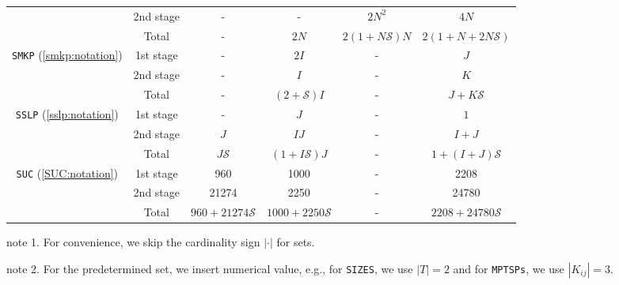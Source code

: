 \begin{table}[H]
{\begin{threeparttable}
\begin{tabular}{@{}cccccc@{}}
				& 2nd stage & -              & -                                  & $2N^2 $              & $4N$                     \\ \cmidrule(l){2-6} 
				& Total          & -              & $2N$                               & $2(1+N\mathcal{S})N$ & $2(1+N+2N\mathcal{S})$    \\ \midrule
				\multirow{3}{*}{\texttt{SMKP} (\ref{smkp:notation})}   & 1st stage & -              & $2I$                               & -                    & $J$                       \\
				& 2nd stage & -              & $I$                                & -                    & $K$                       \\ \cmidrule(l){2-6} 
				& Total          & -              & $(2+\mathcal{S})I$                 & -                    & $J+K\mathcal{S}$          \\ \midrule
				\multirow{3}{*}{\texttt{SSLP} (\ref{sslp:notation})}   & 1st stage & -              & $J$                                & -                    & $1$                       \\
				& 2nd stage & $J$            & $IJ$                               & -                    & $I+J$                     \\ \cmidrule(l){2-6} 
				& Total          & $J\mathcal{S}$ & $(1+I\mathcal{S})J$                & -                    & $1+(I+J)\mathcal{S}$      \\ \midrule
				\multirow{3}{*}{\texttt{SUC} (\ref{SUC:notation})}   & 1st stage & 960               &   1000                                 &     -                 &  2208                         \\
				& 2nd stage & 21274               &     2250                               &   -                   & 24780                          \\ \cmidrule(l){2-6} 
				& Total          & $960+21274\mathcal{S}$                &  $1000+2250\mathcal{S}$                                  &  -                    &  $2208+24780\mathcal{S}$                         \\ \bottomrule
			\end{tabular}
			
			\begin{tablenotes}
				\small
				\item note 1. For convenience, we skip the cardinality sign $|\cdot|$ for sets.
				\item note 2. For the predetermined set, we insert numerical value, e.g., for \texttt{SIZES}, we use $|T|=2$ and for \texttt{MPTSPs}, we use $|K_{ij}|=3$.
			\end{tablenotes}
		\end{threeparttable}
	}
\end{table}

